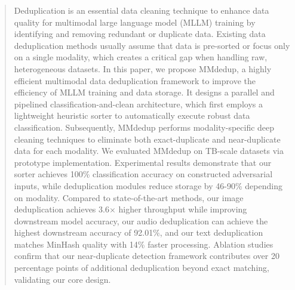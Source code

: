 \documentclass[sigconf, nonacm]{acmart}
\begin{document}
\begin{abstract}

Deduplication is an essential data cleaning technique to enhance data quality for multimodal large language model (MLLM) training by identifying and removing redundant or duplicate data. Existing data deduplication methods usually assume that data is pre-sorted or focus only on a single modality, which creates a critical gap when handling raw, heterogeneous datasets. In this paper, we propose MMdedup, a highly efficient multimodal data deduplication framework to improve the efficiency of MLLM training and data storage. It designs a parallel and pipelined classification-and-clean architecture, which first employs a lightweight heuristic sorter to automatically execute robust data classification. Subsequently, MMdedup performs modality-specific deep cleaning techniques to eliminate both exact-duplicate and near-duplicate data for each modality. We evaluated MMdedup on TB-scale datasets via prototype implementation. Experimental results demonstrate that our sorter achieves 100\% classification accuracy on constructed adversarial inputs, while deduplication modules reduce storage by 46-90\% depending on modality. Compared to state-of-the-art methods, our image deduplication achieves 3.6$\times$ higher throughput while improving downstream model accuracy, our audio deduplication can achieve the highest downstream accuracy of 92.01\%, and our text deduplication matches MinHash quality with 14\% faster processing. Ablation studies confirm that our near-duplicate detection framework contributes over 20 percentage points of additional deduplication beyond exact matching, validating our core design.





\end{abstract}
\end{document}
